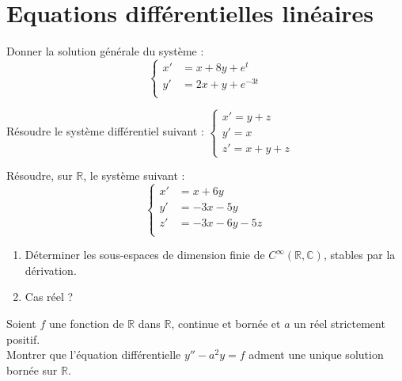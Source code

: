 \section{Equations diff\'erentielles lin\'eaires}

\begin{exer}
Donner la solution g\'en\'erale du syst\`eme :
\begin{equation}
  \left\{
      \begin{aligned}
        x'&=x+8y+e^t \\
        y'&=2x+y+e^{-3t} \\
      \end{aligned}
    \right.
\end{equation}
\end{exer}

\begin{exer}
R\'esoudre le syst\`eme diff\'erentiel suivant :
$\left\{
\begin{array}{l}
  x'=y+z\\
  y'=x\\
  z'=x+y+z
\end{array}
\right.$
\end{exer}

\begin{exer}
R\'esoudre, sur $\mathbb{R}$, le syst\`eme suivant :
\begin{equation}
\left\{
\begin{aligned}
x'&=x+6y\\
y'&=-3x-5y\\
z'&=-3x-6y-5z\\
\end{aligned}
\right.
\end{equation}
\end{exer}

\begin{exer}
\begin{enumerate}
\item Déterminer les sous-espaces de dimension finie de $C^{\infty}(\mathbb{R},\mathbb{C})$, stables par la dérivation.
\item Cas réel ?
\end{enumerate}
\end{exer}

\begin{exer}
Soient $f$ une fonction de $\mathbb{R}$ dans $\mathbb{R}$, continue et born\'ee et $a$ un r\'eel strictement positif.\\
Montrer que l'\'equation diff\'erentielle $y''-a^2y=f$ adment une unique solution born\'ee sur $\mathbb{R}$.
\end{exer}


